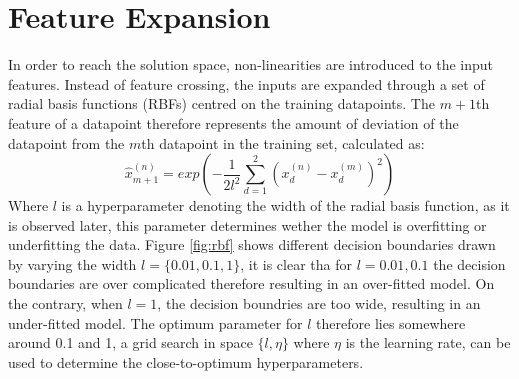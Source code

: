 \documentclass[journal]{IEEEtran}
\begin{document}
\section{Feature Expansion}
\label{sec:fet}
In order to reach the solution space, non-linearities are introduced to the input features. Instead of feature crossing, the inputs are expanded through a set of radial basis functions (RBFs) centred on the training datapoints. The $m+1$th feature of a datapoint therefore represents the amount of deviation of the datapoint from the $m$th datapoint in the training set, calculated as:
\begin{equation}
\hat{x}_{m+1}^{(n)} = exp\left(  -  \dfrac{1}{2l^2}   \sum_{d=1}^{2} (x_d^{(n)}  - x_d^{(m)})^2     \right)
\end{equation}
Where $l$ is a hyperparameter denoting the width of the radial basis function, as it is observed later, this parameter determines wether the model is overfitting or underfitting the data. Figure \ref{fig:rbf} shows different decision boundaries drawn by varying the width $l=\{0.01, 0.1, 1\}$, it is clear tha for $l=0.01, 0.1$ the decision boundaries are over complicated therefore resulting in an over-fitted model. On the contrary, when $l=1$, the decision boundries are too wide, resulting in an under-fitted model. The optimum parameter for $l$ therefore lies somewhere around 0.1 and 1, a grid search in space $\{l, \eta\}$ where $\eta$ is the learning rate, can be used to determine the close-to-optimum hyperparameters.
\end{document}
